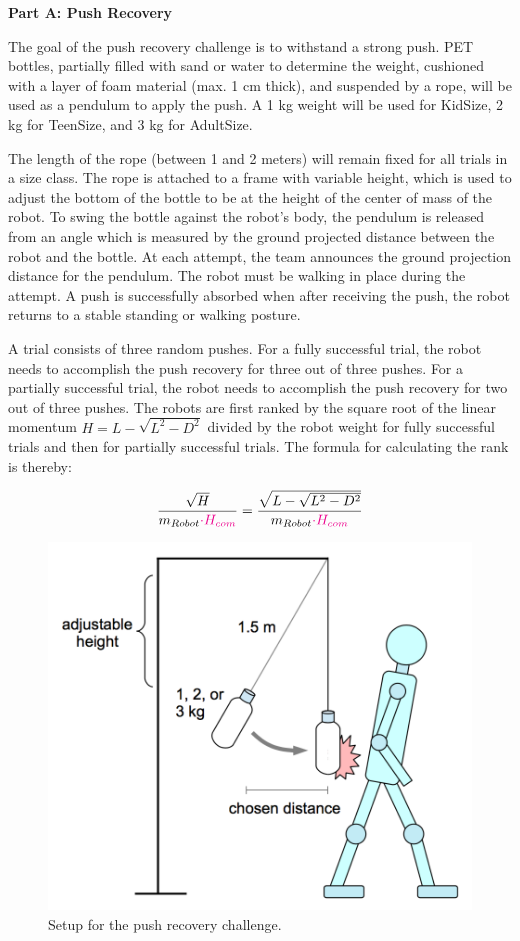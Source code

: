 \clearpage
\sffamily
{\bfseries\color[rgb]{0.4,0.4,0.4}
Part A: Push Recovery }

\bigskip

The goal of the push recovery challenge is to withstand a strong push. PET bottles, partially filled with sand or water to determine the weight, cushioned with a layer of foam material (max. 1 cm thick), and suspended by a rope, will be used as a pendulum to apply the push. A 1 kg weight will be used for KidSize, 2 kg for TeenSize, and 3 kg for AdultSize. 

The length of the rope (between 1 and 2 meters) will remain fixed for all trials in a size class. The rope is attached to a frame with variable height, which is used to adjust the bottom of the bottle to be at the height of the center of mass of the robot. To swing the bottle against the robot's body, the pendulum is released from an angle which is measured by the ground projected distance between the robot and the bottle. At each attempt, the team announces the ground projection distance for the pendulum. The robot must be walking in place during the attempt. A push is successfully absorbed when after receiving the push, the robot returns to a stable standing or walking posture. 

A trial consists of three random pushes. For a fully successful trial, the robot needs to accomplish the push recovery for three out of three pushes. For a partially successful trial, the robot needs to accomplish the push recovery for two out of three pushes. The robots are first ranked by the square root of the linear momentum $H = L - \sqrt{L^{2} - D^{2}}$ divided by the robot weight for fully successful trials and then for partially successful trials. The formula for calculating the rank is thereby:


\begin{align*}
\dfrac{\sqrt{H}}{m_{Robot} \textcolor{magenta}{\cdot H_{com}}} =  \dfrac{\sqrt{L - \sqrt{L^{2} - D^{2}}}}{m_{Robot} \textcolor{magenta}{\cdot H_{com}}}
\end{align*}

\begin{figure}[h]
\begin{center}
\includegraphics[scale=1.0]{img/push_recovery.png}
\caption{Setup for the push recovery challenge. }
\end{center}
\end{figure}